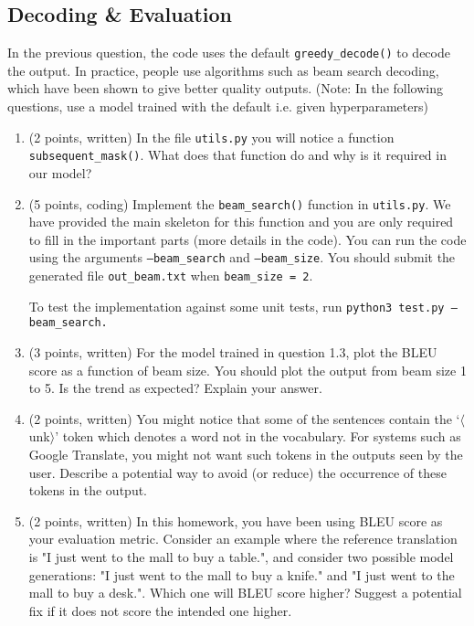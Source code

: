 \documentclass{article}
\theoremstyle{case}
\theoremstyle{definition}
\begin{document}
\newpage
\subsection{Decoding \& Evaluation}

In the previous question, the code uses the default \texttt{greedy\_decode()} to decode the output.  In practice, people use algorithms such as beam search decoding, which have been shown to give better quality outputs. (Note: In the following questions, use a model trained with the default i.e. given hyperparameters)

\begin{enumerate}

    \item (2 points, written) In the file \texttt{utils.py} you will notice a function \texttt{subsequent\_mask()}. What does that function do and why is it required in our model?

    \newpage
    \item (5 points, coding) Implement the \texttt{beam\_search()} function in \texttt{utils.py}. We have provided the main skeleton for this function and you are only required to fill in the important parts (more details in the code). You can run the code using the arguments \texttt{--beam\_search} and \texttt{--beam\_size}. You should submit the generated file \texttt{out\_beam.txt} when \texttt{beam\_size = 2}.
    
    To test the implementation against some unit tests, run \texttt{python3 test.py --beam\_search.}
    

    \newpage
    \item (3 points, written) For the model trained in question 1.3, plot the BLEU score as a function of beam size. You should plot the output from beam size 1 to 5. Is the trend as expected? Explain your answer.


    \newpage
    \item (2 points, written) You might notice that some of the sentences contain the `$\langle$unk$\rangle$' token which denotes a word not in the vocabulary. For systems such as Google Translate, you might not want such tokens in the outputs seen by the user. Describe a potential way to avoid (or reduce) the occurrence of these tokens in the output.


    \newpage
    \item (2 points, written) In this homework, you have been using BLEU score as your evaluation metric. Consider an example where the reference translation is "I just went to the mall to buy a table.", and consider two possible model generations: "I just went to the mall to buy a knife." and "I just went to the mall to buy a desk.". Which one will BLEU score higher? Suggest a potential fix if it does not score the intended one higher.

    
\end{enumerate}
\end{document}
